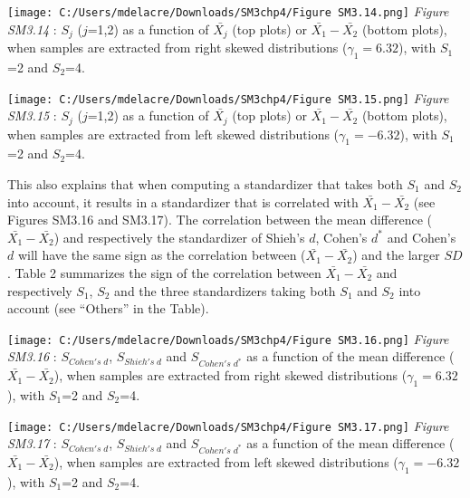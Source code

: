 \documentclass[
  english,
  man,mask,floatsintext]{apa6}
\begin{document}
\newpage

\texttt{[image: C:/Users/mdelacre/Downloads/SM3chp4/Figure SM3.14.png]}
\emph{Figure SM3.14} : \(S_j\) (\(j\)=1,2) as a function of \(\bar{X_j}\) (top plots) or \(\bar{X_1}-\bar{X_2}\) (bottom plots), when samples are extracted from right skewed distributions (\(\gamma_1 = 6.32\)), with \(S_1\)=2 and \(S_2\)=4.

\newpage

\texttt{[image: C:/Users/mdelacre/Downloads/SM3chp4/Figure SM3.15.png]}
\emph{Figure SM3.15} : \(S_j\) (\(j\)=1,2) as a function of \(\bar{X_j}\) (top plots) or \(\bar{X_1}-\bar{X_2}\) (bottom plots), when samples are extracted from left skewed distributions (\(\gamma_1 = -6.32\)), with \(S_1\)=2 and \(S_2\)=4.

\newpage

\setlength\parindent{24pt}This also explains that when computing a standardizer that takes both \(S_1\) and \(S_2\) into account, it results in a standardizer that is correlated with \(\bar{X_1}-\bar{X_2}\) (see Figures SM3.16 and SM3.17). The correlation between the mean difference (\(\bar{X_1}-\bar{X_2}\)) and respectively the standardizer of Shieh's \(d\), Cohen's \(d^*\) and Cohen's \(d\) will have the same sign as the correlation between (\(\bar{X_1}-\bar{X_2}\)) and the larger \(SD\). Table 2 summarizes the sign of the correlation between \(\bar{X_1}-\bar{X_2}\) and respectively \(S_1\), \(S_2\) and the three standardizers taking both \(S_1\) and \(S_2\) into account (see ``Others'' in the Table).

\texttt{[image: C:/Users/mdelacre/Downloads/SM3chp4/Figure SM3.16.png]}
\emph{Figure SM3.16} : \(S_{Cohen's \; d}\), \(S_{Shieh's \; d}\) and \(S_{Cohen's \; d^*}\) as a function of the mean difference (\(\bar{X_1}-\bar{X_2}\)), when samples are extracted from right skewed distributions (\(\gamma_1 = 6.32\)), with \(S_1\)=2 and \(S_2\)=4.

\newpage

\texttt{[image: C:/Users/mdelacre/Downloads/SM3chp4/Figure SM3.17.png]}
\emph{Figure SM3.17} : \(S_{Cohen's \; d}\), \(S_{Shieh's \; d}\) and \(S_{Cohen's \; d^*}\) as a function of the mean difference (\(\bar{X_1}-\bar{X_2}\)), when samples are extracted from left skewed distributions (\(\gamma_1 = -6.32\)), with \(S_1\)=2 and \(S_2\)=4.

\newpage
\end{document}
